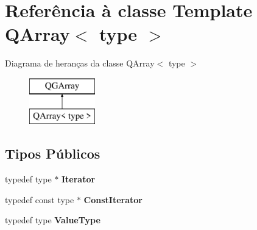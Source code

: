 \hypertarget{class_q_array}{\section{Referência à classe Template Q\-Array$<$ type $>$}
\label{class_q_array}
}
Diagrama de heranças da classe Q\-Array$<$ type $>$\begin{figure}[H]
\begin{center}
\leavevmode
\includegraphics[height=2.000000cm]{class_q_array}
\end{center}
\end{figure}
\subsection*{Tipos Públicos}
\begin{DoxyCompactItemize}
\item 
\hypertarget{class_q_array_a65abdb9b75afa9ab962630a4dde96c63}{typedef type $\ast$ {\bfseries Iterator}}\label{class_q_array_a65abdb9b75afa9ab962630a4dde96c63}

\item 
\hypertarget{class_q_array_a58d914a7346700d678d0d931227fd656}{typedef const type $\ast$ {\bfseries Const\-Iterator}}\label{class_q_array_a58d914a7346700d678d0d931227fd656}

\item 
\hypertarget{class_q_array_a96311d4ed9c990111de998dce828fb27}{typedef type {\bfseries Value\-Type}}\label{class_q_array_a96311d4ed9c990111de998dce828fb27}

\end{DoxyCompactItemize}

